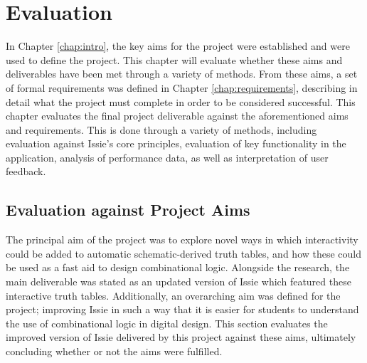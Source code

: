 \chapter{Evaluation}
In Chapter \ref{chap:intro}, the key aims for the project were established and were used to define the project. This chapter will evaluate whether these aims and deliverables have been met through a variety of methods. From these aims, a set of formal requirements was defined in Chapter \ref{chap:requirements}, describing in detail what the project must complete in order to be considered successful. This chapter evaluates the final project deliverable against the aforementioned aims and requirements. This is done through a variety of methods, including evaluation against Issie's core principles, evaluation of key functionality in the application, analysis of performance data, as well as interpretation of user feedback. 

\section{Evaluation against Project Aims}
The principal aim of the project was to explore novel ways in which interactivity could be added to automatic schematic-derived truth tables, and how these could be used as a fast aid to design combinational logic. Alongside the research, the main deliverable was stated as an updated version of Issie which featured these interactive truth tables. Additionally, an overarching aim was defined for the project; improving Issie in such a way that it is easier for students to understand the use of combinational logic in digital design. This section evaluates the improved version of Issie delivered by this project against these aims, ultimately concluding whether or not the aims were fulfilled.

